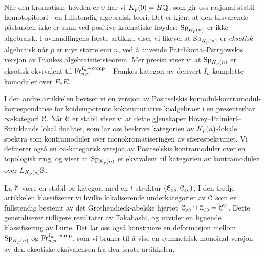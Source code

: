 Når den kromatiske høyden er $0$ har vi $K_p(0) = H\mathbb{Q}$, som gir oss rasjonal stabil homotopiteori---en fullstendig algebraisk teori. Det er kjent at den tilsvarende påstanden ikke er sann ved positive kromatiske høyder: $\mathrm{Sp}_{K_p(n)}$ er ikke algebraisk. I avhandlingens første artikkel viser vi likevel at $\mathrm{Sp}_{K_p(n)}$ er \emph{eksotisk} algebraisk når $p$ er mye større enn $n$, ved å anvende Patchkoria--Pstr\a{}gowskis versjon av Frankes algebraisitetsteorem. Mer presist viser vi at $\mathrm{Sp}_{K_p(n)}$ er eksotisk ekvivalent til $\mathrm{Fr}_{n,p}^{I_n-\mathrm{comp}}$---Frankes kategori av derivert $I_n$-komplette komoduler over $E_*E$. 

I den andre artikkelen beviser vi en versjon av Positselskis komodul-kontramodul-korrespondanse for koidempotente kokommutative koalgebraer i en presenterbar $\infty$-kategori $\EuScript{C}$. Når $\EuScript{C}$ er stabil viser vi at dette gjenskaper Hovey--Palmieri--Stricklands lokal dualitet, som lar oss beskrive kategorien av ${K_p(n)}$-lokale spektra som kontramoduler over monokromatiseringen av sfærespektumet. Vi definerer også en $\infty$-kategorisk versjon av Positselskis kontramoduler over en topologisk ring, og viser at $\mathrm{Sp}_{K_p(n)}$ er ekvivalent til kategorien av kontramoduler over $L_{K_p(n)} \mathbb{S}$. 

La $\EuScript{C}$ være en stabil $\infty$-kategori med en $t$-struktur $(\EuScript{C}_{\hspace{-1pt}\scriptscriptstyle\geqslant 0}, \EuScript{C}_{\hspace{-1pt}\scriptscriptstyle\leqslant 0})$. I den tredje artikkelen klassifiserer vi hvilke lokaliserende underkategorier av $\EuScript{C}$ som er fullstendig bestemt av det Grothendieck-abelske hjertet $\EuScript{C}_{\hspace{-1pt}\scriptscriptstyle\geqslant 0} \cap \EuScript{C}_{\hspace{-1pt}\scriptscriptstyle\leqslant 0} = \EuScript{C}^\heartsuit$. Dette generaliserer tidligere resultater av Takahashi, og utvider en lignende klassifisering av Lurie. Det lar oss også konstruere en deformasjon mellom $\mathrm{Sp}_{K_p(n)}$ og $\mathrm{Fr}_{n,p}^{I_n-\mathrm{comp}}$, som vi bruker til å vise en symmetrisk monoidal versjon av den eksotiske eksivalensen fra den første artikkelen. 



